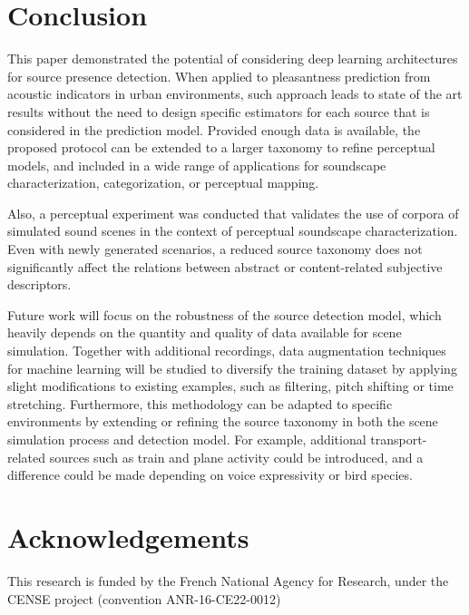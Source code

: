 \documentclass[twocolumn]{article}
\begin{document}
\section{Conclusion}
\label{sec:conclusion}

This paper demonstrated the potential of considering deep learning architectures for source presence detection. When applied to pleasantness prediction from acoustic indicators in urban environments, such approach leads to state of the art results without the need to design specific estimators for each source that is considered in the prediction model. Provided enough data is available, the proposed protocol can be extended to a larger taxonomy to refine perceptual models, and included in a wide range of applications for soundscape characterization, categorization, or perceptual mapping.

Also, a perceptual experiment was conducted that validates the use of corpora of simulated sound scenes in the context of perceptual soundscape characterization. Even with newly generated scenarios, a reduced source taxonomy does not significantly affect the relations between abstract or content-related subjective descriptors.

Future work will focus on the robustness of the source detection model, which heavily depends on the quantity and quality of data available for scene simulation. Together with additional recordings, data augmentation techniques for machine learning will be studied to diversify the training dataset by applying slight modifications to existing examples, such as filtering, pitch shifting or time stretching. Furthermore, this methodology can be adapted to specific environments by extending or refining the source taxonomy in both the scene simulation process and detection model. For example, additional transport-related sources such as train and plane activity could be introduced, and a difference could be made depending on voice expressivity or bird species.

\section*{Acknowledgements}
\label{sec:ack}

This research is funded by the French National Agency for Research, under the CENSE project (convention ANR-16-CE22-0012)




\end{document}
